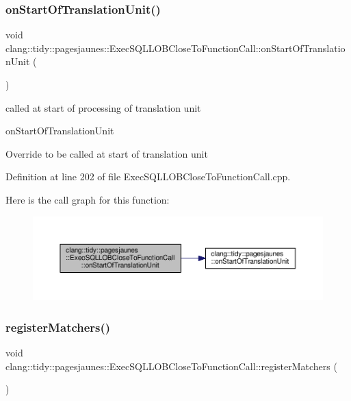 \subsubsection{\texorpdfstring{on\+Start\+Of\+Translation\+Unit()}{onStartOfTranslationUnit()}}
{\footnotesize\ttfamily void clang\+::tidy\+::pagesjaunes\+::\+Exec\+S\+Q\+L\+L\+O\+B\+Close\+To\+Function\+Call\+::on\+Start\+Of\+Translation\+Unit (\begin{DoxyParamCaption}{ }\end{DoxyParamCaption})}



called at start of processing of translation unit 

on\+Start\+Of\+Translation\+Unit

Override to be called at start of translation unit 

Definition at line 202 of file Exec\+S\+Q\+L\+L\+O\+B\+Close\+To\+Function\+Call.\+cpp.

Here is the call graph for this function\+:
\nopagebreak
\begin{figure}[H]
\begin{center}
\leavevmode
\includegraphics[width=350pt]{classclang_1_1tidy_1_1pagesjaunes_1_1_exec_s_q_l_l_o_b_close_to_function_call_a229d757dae72929f6282a71940161a6b_cgraph}
\end{center}
\end{figure}
\mbox{\label{classclang_1_1tidy_1_1pagesjaunes_1_1_exec_s_q_l_l_o_b_close_to_function_call_adbb0c6d9eb3bd25698ccf9e6a73212cc}} 
\subsubsection{\texorpdfstring{register\+Matchers()}{registerMatchers()}}
{\footnotesize\ttfamily void clang\+::tidy\+::pagesjaunes\+::\+Exec\+S\+Q\+L\+L\+O\+B\+Close\+To\+Function\+Call\+::register\+Matchers (\begin{DoxyParamCaption}\item[{ast\+\_\+matchers\+::\+Match\+Finder $\ast$}]{ }\end{DoxyParamCaption})\hspace{0.3cm}{\ttfamily [override]}}



